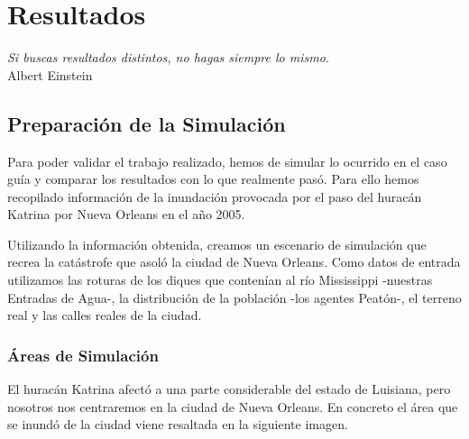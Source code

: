 \chapter{Resultados} \label{cap6}

\begin{flushright}
\begin{minipage}{7.85cm}
    {\em Si buscas resultados distintos, no hagas siempre lo mismo.} \\ Albert
    Einstein
\end{minipage}
\end{flushright}

\vspace*{5mm}

\section{Preparación de la Simulación}

Para poder validar el trabajo realizado, hemos de simular lo ocurrido en el
caso guía y comparar los resultados con lo que realmente pasó. Para ello hemos
recopilado información de la inundación provocada por el paso del huracán
Katrina por Nueva Orleans en el año 2005.

Utilizando la información obtenida, creamos un escenario de simulación que
recrea la catástrofe que asoló la ciudad de Nueva Orleans. Como datos de
entrada utilizamos las roturas de los diques que contenían al río Mississippi
-nuestras Entradas de Agua-, la distribución de la población -los agentes
Peatón-, el terreno real y las calles reales de la ciudad.

\subsection{Áreas de Simulación}

El huracán Katrina afectó a una parte considerable del estado de Luisiana, pero
nosotros nos centraremos en la ciudad de Nueva Orleans. En concreto el área que
se inundó de la ciudad viene resaltada en la siguiente imagen.

